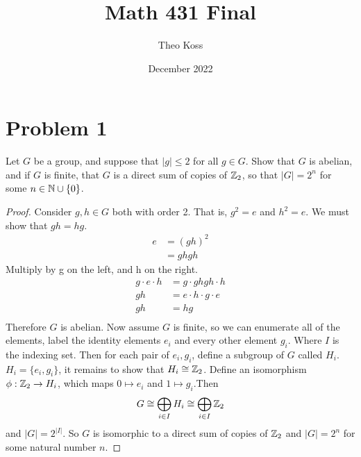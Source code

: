 \documentclass[a4paper,12pt]{extarticle}
\title{Math 431 Final}
\author{Theo Koss}
\date{December 2022}
\theoremstyle{definition}
\begin{document}
    \maketitle
    \section*{Problem 1}
    Let $G$ be a group, and suppose that $|g|\leq2$ for all $g\in G$. Show that $G$ is abelian, and if $G$ is finite, that $G$ is a direct sum of copies of $\mathbb{Z}_2$, so that $|G|=2^n$ for some $n\in\mathbb{N}\cup\{0\}$.
    \begin{proof}
    Consider $g,h\in G$ both with order 2. That is, $g^2=e$ and $h^2=e$. We must show that $gh=hg$. \begin{align*}
       e&=(gh)^2\\
       &=ghgh
    \end{align*}Multiply by g on the left, and h on the right.\begin{align*}
        g\cdot e\cdot h&= g\cdot ghgh\cdot h\\
        gh &= e\cdot h\cdot g\cdot e\\
        gh &=hg \\
    \end{align*} Therefore $G$ is abelian.
    \myskip Now assume $G$ is finite, so we can enumerate all of the elements, label the identity elements $e_i$ and every other element $g_i$. Where $I$ is the indexing set. Then for each pair of $e_i,g_i$, define a subgroup of $G$ called $H_i$. $H_i=\{e_i,g_i\}$, it remains to show that $H_i\cong\mathbb{Z}_2$. Define an isomorphism $\phi:\mathbb{Z}_2\to H_i$, which maps $0\mapsto e_i$ and $1\mapsto g_i$.\myskip Then $$G\cong\bigoplus_{i\in I}H_i\cong\bigoplus_{i\in I}\mathbb{Z}_2$$ and $|G|=2^{|I|}$. So $G$ is isomorphic to a direct sum of copies of $\mathbb{Z}_2$ and $|G|=2^n$ for some natural number $n$.
    \end{proof}
\end{document}

